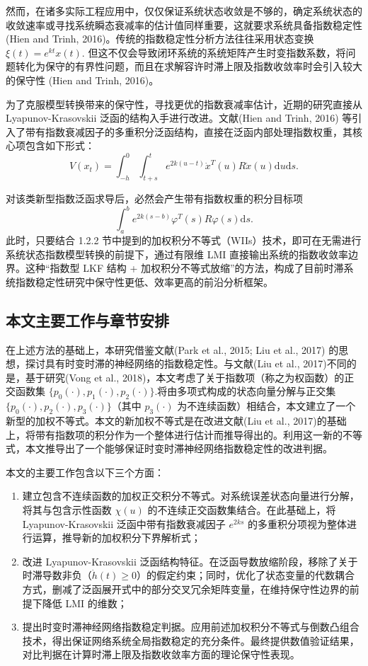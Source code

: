 \documentclass[a4paper, 12pt, oneside]{article}
\theoremstyle{cn_theorem}
\begin{document}
然而，在诸多实际工程应用中，仅仅保证系统状态收敛是不够的，确定系统状态的收敛速率或寻找系统瞬态衰减率的估计值同样重要，这就要求系统具备指数稳定性 (Hien and Trinh, 2016)。传统的指数稳定性分析方法往往采用状态变换 $\xi(t) = e^{kt}x(t)$. 但这不仅会导致闭环系统的系统矩阵产生时变指数系数，将问题转化为保守的有界性问题，而且在求解容许时滞上限及指数收敛率时会引入较大的保守性 (Hien and Trinh, 2016)。

为了克服模型转换带来的保守性，寻找更优的指数衰减率估计，近期的研究直接从 Lyapunov-Krasovskii 泛函的结构入手进行改进。文献(Hien and Trinh, 2016) 等引入了带有指数衰减因子的多重积分泛函结构，直接在泛函内部处理指数权重，其核心项包含如下形式：
\begin{equation*}
    V(x_t) = \int_{-h}^0 \int_{t+s}^t e^{2k(u-t)} \dot{x}^T(u) R \dot{x}(u) \mathrm{d}u \mathrm{d}s.
\end{equation*}

对该类新型指数泛函求导后，必然会产生带有指数权重的积分目标项
\begin{equation*}
    \int_a^b e^{2k(s-b)} \varphi^T(s) R \varphi(s) \mathrm{d}s.
\end{equation*}
此时，只要结合 1.2.2 节中提到的加权积分不等式（WIIs）技术，即可在无需进行系统状态指数模型转换的前提下，通过有限维 LMI 直接输出系统的指数收敛率边界。这种“指数型 LKF 结构 + 加权积分不等式放缩”的方法，构成了目前时滞系统指数稳定性研究中保守性更低、效率更高的前沿分析框架。

\subsection{本文主要工作与章节安排}

在上述方法的基础上，本研究借鉴文献(Park et al., 2015; Liu et al., 2017) 的思想，探讨具有时变时滞的神经网络的指数稳定性。与文献(Liu et al., 2017)不同的是，基于研究(Vong et al., 2018)，本文考虑了关于指数项（称之为权函数）的正交函数集 $\{p_0(\cdot), p_1(\cdot), p_2(\cdot)\}$.将由多项式构成的状态向量分解与正交集 $\{p_0(\cdot), p_2(\cdot), p_3(\cdot)\}$（其中 $p_3(\cdot)$ 为不连续函数）相结合，本文建立了一个新型的加权不等式。本文的新加权不等式是在改进文献(Liu et al., 2017)的基础上，将带有指数项的积分作为一个整体进行估计而推导得出的。利用这一新的不等式，本文推导出了一个能够保证时变时滞神经网络指数稳定性的改进判据。

本文的主要工作包含以下三个方面：
\begin{enumerate}
    \item 建立包含不连续函数的加权正交积分不等式。对系统误差状态向量进行分解，将其与包含示性函数 $\chi(u)$ 的不连续正交函数集结合。在此基础上，将 Lyapunov-Krasovskii 泛函中带有指数衰减因子 $e^{2ks}$ 的多重积分项视为整体进行运算，推导新的加权积分下界解析式；
    \item 改进 Lyapunov-Krasovskii 泛函结构特征。在泛函导数放缩阶段，移除了关于时滞导数非负（$\dot{h}(t) \ge 0$）的假定约束；同时，优化了状态变量的代数耦合方式，删减了泛函展开式中的部分交叉冗余矩阵变量，在维持保守性边界的前提下降低 LMI 的维数；
    \item 提出时变时滞神经网络指数稳定判据。应用前述加权积分不等式与倒数凸组合技术，得出保证网络系统全局指数稳定的充分条件。最终提供数值验证结果，对比判据在计算时滞上限及指数收敛率方面的理论保守性表现。
\end{enumerate}
\end{document}
